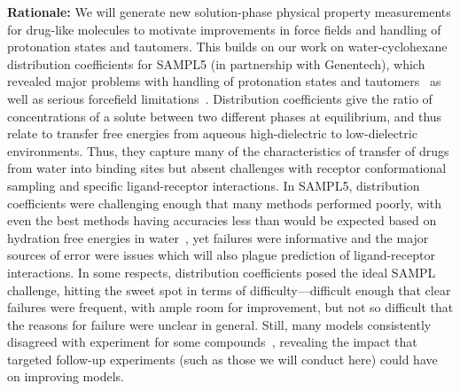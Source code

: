\documentclass[11pt]{article}
\begin{document}
{\bf Rationale:}
We will generate new solution-phase physical property measurements for drug-like molecules to motivate improvements in force fields and handling of protonation states and tautomers.
This builds on our work on water-cyclohexane distribution coefficients for SAMPL5 (in partnership with Genentech), which revealed major problems with handling of protonation states and tautomers~\cite{bannan_blind_2016}  as well as serious forcefield limitations~\cite{paranahewage_predicting_2016}.
Distribution coefficients give the ratio of concentrations of a solute between two different phases at equilibrium, and thus relate to transfer free energies from aqueous high-dielectric to low-dielectric environments.
Thus, they capture many of the characteristics of transfer of drugs from water into binding sites but absent challenges with receptor conformational sampling and specific ligand-receptor interactions.
In SAMPL5, distribution coefficients were challenging enough that many methods performed poorly, with even the best methods having accuracies less than would be expected based on hydration free energies in water~\cite{bannan_blind_2016}, yet failures were informative and the major sources of error were issues which will also plague prediction of ligand-receptor interactions.
In some respects, distribution coefficients posed the ideal SAMPL challenge, hitting the sweet spot in terms of difficulty---difficult enough that clear failures were frequent, with ample room for improvement, but not so difficult that the reasons for failure were unclear in general. 
Still, many models consistently disagreed with experiment for some compounds~\cite{paranahewage_predicting_2016, klamt_prediction_2016, bannan_blind_2016, rustenburg_measuring_2016}, revealing the impact that targeted follow-up experiments (such as those we will conduct here) could have on improving models.
\end{document}
